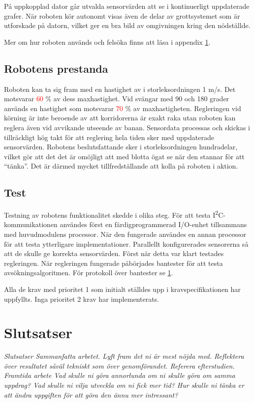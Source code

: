 \documentclass[11pt]{article}
\begin{document}
\begin{flushleft}
På uppkopplad dator går utvalda sensorvärden att se i kontinuerligt uppdaterade grafer. När roboten kör autonomt visas även de delar av grottsystemet som är utforskade på datorn, vilket ger en bra bild av omgivningen kring den nödställde.

Mer om hur roboten används och felsöka finns att läsa i appendix \ref{}.

\subsection{Robotens prestanda}
Roboten kan ta sig fram med en hastighet av i storleksordningen 1 m/s. Det motsvarar \textcolor{red}{60 }\% av dess maxhastighet. Vid svängar med 90 och 180 grader används en hastighet som motsvarar \textcolor{red}{70 }\% av maxhastigheten. Regleringen vid körning är inte beroende av att korridorerna är exakt raka utan roboten kan reglera även vid avvikande utseende av banan. Sensordata processas och skickas i tillräckligt hög takt för att reglering hela tiden sker med uppdaterade sensorvärden. Robotens beslutsfattande sker i storleksordningen hundradelar, vilket gör att det det är omöjligt att med blotta ögat se när den stannar för att ``tänka''. Det är därmed mycket tillfredställande att kolla på roboten i aktion.

\subsection{Test}
Testning av robotens funktionalitet skedde i olika steg. För att testa I\textsuperscript{2}C-kommunikationen användes först en färdigprogrammerad I/O-enhet tillsammans med huvudmodulens processor. När den fungerade användes en annan processor för att testa ytterligare implementationer. Parallellt konfigurerades sensorerna så att de skulle ge korrekta sensorvärden. Först när detta var klart testades regleringen. När regleringen fungerade påbörjades bantester för att testa avsökningsalgoritmen. För protokoll över bantester se \ref{}. 

Alla de krav med prioritet 1 som initialt ställdes upp i kravspecifikationen har uppfyllts. Inga prioritet 2 krav har implementerats.

\pagebreak

\section{Slutsatser}
\textit{Slutsatser
Sammanfatta arbetet. 
Lyft fram det ni är mest nöjda med.
Reflektera över resultatet såväl tekniskt som över genomförandet. Referera efterstudien.}
\textit{Framtida arbete
Vad skulle ni göra annorlunda om ni skulle göra om samma uppdrag?
Vad skulle ni vilja utveckla om ni fick mer tid?
Hur skulle ni tänka er att ändra uppgiften för att göra den ännu mer intressant?}


\end{flushleft}
\end{document}
